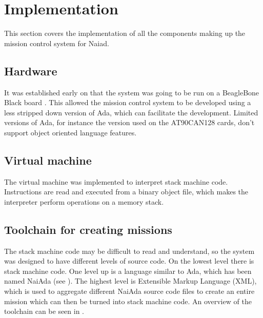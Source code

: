 \section{Implementation}\label{sec:implementation}
This section covers the implementation of all the components making up the mission control system for Naiad.
\subsection{Hardware}
It was established early on that the system was going to be run on a BeagleBone Black board \cite{web:mcsbbb}. This allowed the mission control system to be developed using a less stripped down version of Ada, which can facilitate the development. Limited versions of Ada, for instance the version used on the AT90CAN128 \cite{web:mcsatcan} cards, don't support object oriented language features.

\subsection{Virtual machine}
The virtual machine was implemented to interpret stack machine code. Instructions are read and executed from a binary object file, which makes the interpreter perform operations on
a memory stack.

\subsection{Toolchain for creating missions}
The stack machine code may be difficult to read and understand, so the system was designed to have different levels of source code. On the lowest level there is
stack machine code. One level up is a language similar to Ada, which has been named NaiAda (see ). The highest level is Extensible Markup Language (XML), which is used to aggregate different NaiAda source code files
to create an entire mission which can then be turned into stack machine code. An overview of the toolchain can be seen in .

